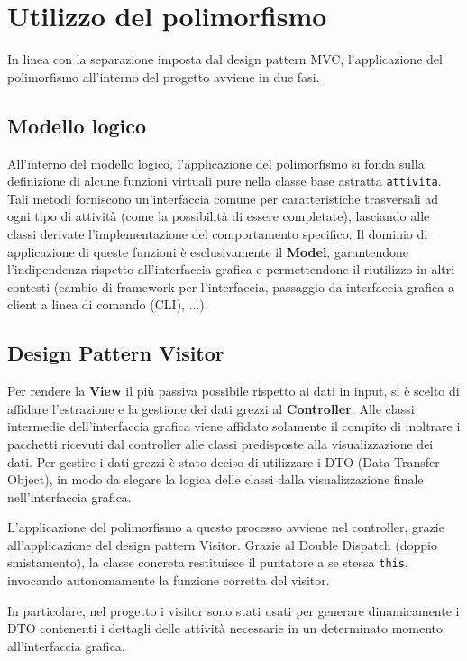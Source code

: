 \section{Utilizzo del polimorfismo}

In linea con la separazione imposta dal design pattern MVC, l'applicazione del polimorfismo
all'interno del progetto avviene in due fasi.

\subsection{Modello logico}

All'interno del modello logico, l'applicazione del polimorfismo si fonda sulla definizione di
alcune funzioni virtuali pure nella classe base astratta \texttt{attivita}.
Tali metodi forniscono un'interfaccia comune per caratteristiche trasversali ad ogni tipo di
attività (come la possibilità di essere completate), lasciando alle classi derivate l'implementazione
del comportamento specifico.
Il dominio di applicazione di queste funzioni è esclusivamente il \textbf{Model}, garantendone l'indipendenza
rispetto all'interfaccia grafica e permettendone il riutilizzo in altri contesti (cambio di framework
per l'interfaccia, passaggio da interfaccia grafica a client a linea di comando (CLI), ...).

\subsection{Design Pattern Visitor}

Per rendere la \textbf{View} il più passiva possibile rispetto ai dati in input, si è scelto di
affidare l'estrazione e la gestione dei dati grezzi al \textbf{Controller}. Alle classi
intermedie dell'interfaccia grafica viene affidato solamente il compito di inoltrare i pacchetti ricevuti
dal controller alle classi predisposte alla visualizzazione dei dati.
Per gestire i dati grezzi è stato deciso di utilizzare i DTO (Data Transfer Object), in modo da
slegare la logica delle classi dalla visualizzazione finale nell'interfaccia grafica.

L'applicazione del polimorfismo a questo processo avviene nel controller, grazie all'applicazione
del design pattern Visitor. Grazie al Double Dispatch (doppio smistamento), la classe concreta
restituisce il puntatore a se stessa \texttt{this}, invocando autonomamente la funzione corretta
del visitor.

In particolare, nel progetto i visitor sono stati usati per generare dinamicamente i DTO contenenti
i dettagli delle attività necessarie in un determinato momento all'interfaccia grafica.


